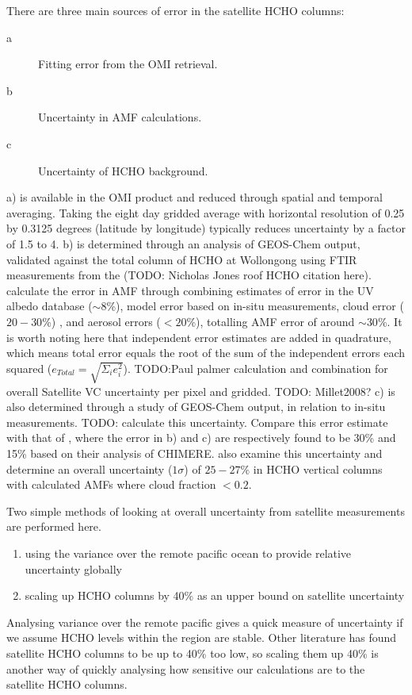     There are three main sources of error in the satellite HCHO columns:
    \begin{description}
      \item[a] Fitting error from the OMI retrieval.
      \item[b] Uncertainty in AMF calculations.
      \item[c] Uncertainty of HCHO background.
    \end{description}
    a) is available in the OMI product and reduced through spatial and temporal averaging.
    Taking the eight day gridded average with horizontal resolution of 0.25 by 0.3125 degrees (latitude by longitude) typically reduces uncertainty by a factor of 1.5 to 4.
    b) is determined through an analysis of GEOS-Chem output, validated against the total column of HCHO at Wollongong using FTIR measurements from the (TODO: Nicholas Jones roof HCHO citation here).
    \textcite{Palmer2006} calculate the error in AMF through combining estimates of error in the UV albedo database ($\sim 8$\%), model error based on in-situ measurements, cloud error  ($20-30$\%) \parencite{Martin2003}, and aerosol errors ($<20$\%), totalling AMF error of around $\sim 30$\%.
    It is worth noting here that independent error estimates are added in quadrature, which means total error equals the root of the sum of the independent errors each squared ($e_{Total}=\sqrt{\Sigma_i e_i^2}$).
    TODO:Paul palmer calculation and combination for overall Satellite VC uncertainty per pixel and gridded.
    TODO: Millet2008?
    c) is also determined through a study of GEOS-Chem output, in relation to in-situ measurements.
    TODO: calculate this uncertainty.
    Compare this error estimate with that of \textcite{Curci2010}, where the error in b) and c) are respectively found to be 30\% and 15\% based on their analysis of CHIMERE.
    \textcite{Millet2008} also examine this uncertainty and determine an overall uncertainty ($1\sigma$) of $25-27\%$ in HCHO vertical columns with calculated AMFs where cloud fraction $< 0.2$.
    
    
    
    Two simple methods of looking at overall uncertainty from satellite measurements are performed here.
    \begin{enumerate}
      \item using the variance over the remote pacific ocean to provide relative uncertainty globally \parencite[e.g.][]{DeSmedt2012}
      \item scaling up HCHO columns by 40\% as an upper bound on satellite uncertainty
    \end{enumerate}
    Analysing variance over the remote pacific gives a quick measure of uncertainty if we assume HCHO levels within the region are stable.
    Other literature has found satellite HCHO columns to be up to 40\% too low, so scaling them up 40\% is another way of quickly analysing how sensitive our calculations are to the satellite HCHO columns.
    
